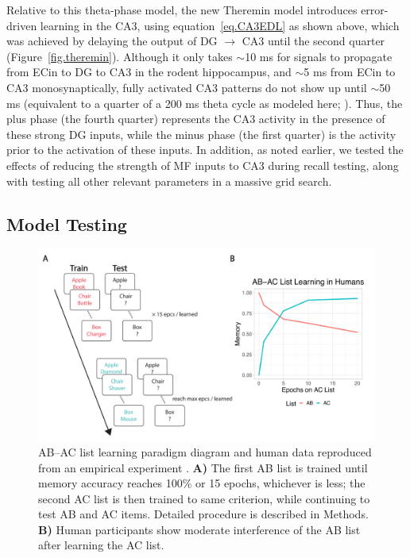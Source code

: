 \documentclass[11pt,twoside]{article}
\newif\myifpdf
\begin{document}
Relative to this theta-phase model, the new Theremin model introduces error-driven learning in the CA3, using equation~\ref{eq.CA3EDL} as shown above, which was achieved by delaying the output of DG $\rightarrow$ CA3 until the second quarter (Figure~\ref{fig.theremin}).  Although it only takes $\sim$10 ms for signals to propagate from ECin to DG to CA3 in the rodent hippocampus, and $\sim$5 ms from ECin to CA3 monosynaptically, fully activated CA3 patterns do not show up until $\sim$50 ms (equivalent to a quarter of a 200 ms theta cycle as modeled here; \citealp{NakagamiSaitoMatsuki97}).  Thus, the plus phase (the fourth quarter) represents the CA3 activity in the presence of these strong DG inputs, while the minus phase (the first quarter) is the activity prior to the activation of these inputs.  In addition, as noted earlier, we tested the effects of reducing the strength of MF inputs to CA3 during recall testing, along with testing all other relevant parameters in a massive grid search.

\subsection{Model Testing}

\begin{figure}
  \centering\includegraphics[width=5in]{fig_hip_edl_abac}
  \caption{\footnotesize AB--AC list learning paradigm diagram and human data reproduced from an empirical experiment \citep{BarnesUnderwood59}. \textbf{A)} The first AB list is trained until memory accuracy reaches 100\% or 15 epochs, whichever is less; the second AC list is then trained to same criterion, while continuing to test AB and AC items.  Detailed procedure is described in Methods. \textbf{B)} Human participants show moderate interference of the AB list after learning the AC list.}
\label{fig.abac}
\end{figure}
\end{document}

